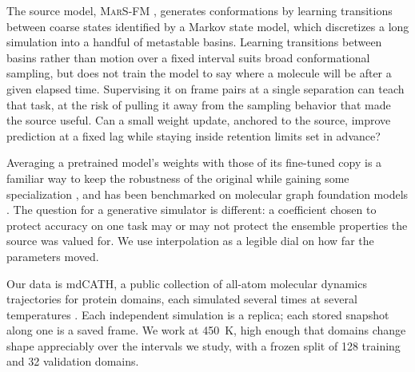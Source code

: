 \documentclass{article}
\newcommand{\marsfm}{\textsc{MarS-FM}}
\begin{document}
The source model, \marsfm{} \citep{kapusniak2026}, generates conformations by learning transitions between coarse states identified by a Markov state model, which discretizes a long simulation into a handful of metastable basins. Learning transitions between basins rather than motion over a fixed interval suits broad conformational sampling, but does not train the model to say where a molecule will be after a given elapsed time. Supervising it on frame pairs at a single separation can teach that task, at the risk of pulling it away from the sampling behavior that made the source useful. Can a small weight update, anchored to the source, improve prediction at a fixed lag while staying inside retention limits set in advance?

Averaging a pretrained model's weights with those of its fine-tuned copy is a familiar way to keep the robustness of the original while gaining some specialization \citep{wortsman2022robust,wortsman2022soups,ilharco2023task}, and has been benchmarked on molecular graph foundation models \citep{liu2025roftmol}. The question for a generative simulator is different: a coefficient chosen to protect accuracy on one task may or may not protect the ensemble properties the source was valued for. We use interpolation as a legible dial on how far the parameters moved.

Our data is mdCATH, a public collection of all-atom molecular dynamics trajectories for protein domains, each simulated several times at several temperatures \citep{mirarchi2024mdcath}. Each independent simulation is a replica; each stored snapshot along one is a saved frame. We work at 450~K, high enough that domains change shape appreciably over the intervals we study, with a frozen split of 128 training and 32 validation domains.
\end{document}
